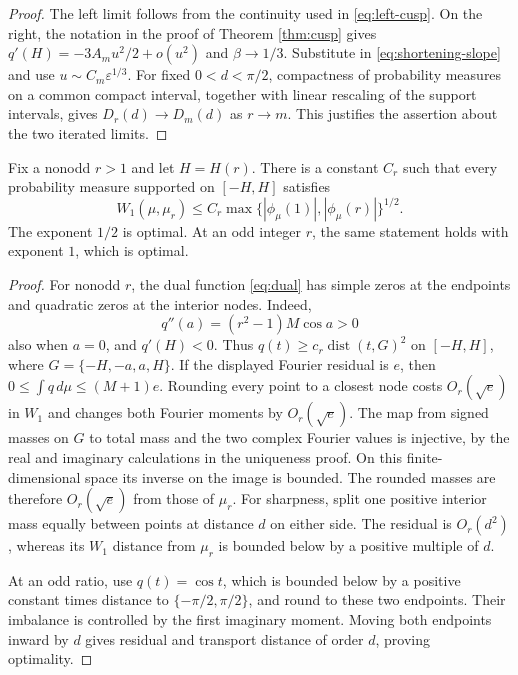 \begin{proof}
The left limit follows from the continuity used in
\eqref{eq:left-cusp}. On the right, the notation in the proof of
Theorem \ref{thm:cusp} gives
$q'(H)=-3A_mu^2/2+o(u^2)$ and $\beta\to1/3$.
Substitute in \eqref{eq:shortening-slope} and use
$u\sim C_m\varepsilon^{1/3}$.
For fixed $0<d<\pi/2$, compactness of probability measures on a common
compact interval, together with linear rescaling of the support
intervals, gives $D_r(d)\to D_m(d)$ as $r\to m$.
This justifies the assertion about the two iterated limits.
\end{proof}

\begin{proposition}
\label{prop:filter-stability}
Fix a nonodd $r>1$ and let $H=H(r)$. There is a constant $C_r$ such that
every probability measure supported on $[-H,H]$ satisfies
\[
 W_1(\mu,\mu_r)\le C_r
       \max\{|\phi_\mu(1)|,|\phi_\mu(r)|\}^{1/2}.
\]
The exponent $1/2$ is optimal. At an odd integer $r$, the same statement
holds with exponent $1$, which is optimal.
\end{proposition}

\begin{proof}
For nonodd $r$, the dual function \eqref{eq:dual} has simple zeros at
the endpoints and quadratic zeros at the interior nodes. Indeed,
\[
 q''(a)=(r^2-1)M\cos a>0
\]
also when $a=0$, and $q'(H)<0$. Thus
$q(t)\ge c_r\operatorname{dist}(t,G)^2$ on $[-H,H]$, where
$G=\{-H,-a,a,H\}$. If the displayed Fourier residual is $e$, then
$0\le\int q\,d\mu\le(M+1)e$. Rounding every point to a closest
node costs $O_r(\sqrt e)$ in $W_1$ and changes both Fourier moments
by $O_r(\sqrt e)$. The map from signed masses on $G$ to total mass and
the two complex Fourier values is injective, by the real and imaginary
calculations in the uniqueness proof. On this finite-dimensional
space its inverse on the image is bounded. The rounded masses are
therefore $O_r(\sqrt e)$ from those of $\mu_r$.
For sharpness, split one positive interior mass equally between
points at distance $d$ on either side. The residual is $O_r(d^2)$,
whereas its $W_1$ distance from $\mu_r$ is bounded below by a positive
multiple of $d$.

At an odd ratio, use $q(t)=\cos t$, which is bounded below by a
positive constant times distance to $\{-\pi/2,\pi/2\}$, and round
to these two endpoints. Their imbalance is controlled by the first
imaginary moment. Moving both endpoints inward by $d$ gives residual
and transport distance of order $d$, proving optimality.
\end{proof}


